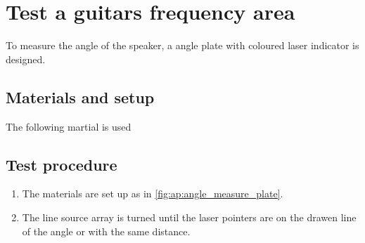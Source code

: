 \chapter{Test a guitars frequency area}
To measure the angle of the speaker, a angle plate with coloured laser indicator is designed. 


\section*{Materials and setup}
The following martial is used

\startequipment
{}
\stopequipment


\section*{Test procedure}


\begin{enumerate}
\item The materials are set up as in \autoref{fig:ap:angle_measure_plate}.
\item The line source array is turned until the laser pointers are on the drawen line of the angle or with the same distance.
\end{enumerate}





